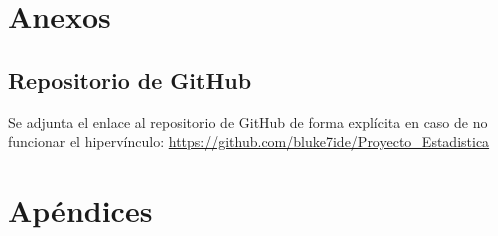 \documentclass[12pt,oneside,letterpaper,spanish]{report}
\begin{document}


\newpage
\doublespacing
\renewcommand{\baselinestretch}{1}\normalsize
\tableofcontents
\renewcommand{\baselinestretch}{1}\normalsize
\singlespacing
\thispagestyle{fancy} %

\newpage
{} 






%
%
\label{EndOfText}
\newpage
{}
\thispagestyle{fancy}



 \label{referencias}
\nocite{*}

 
\thispagestyle{fancy}

\chapter{Anexos}

\section{Repositorio de GitHub} \label{github}
Se adjunta el enlace al repositorio de GitHub de forma explícita en caso de no funcionar el hipervínculo: \url{https://github.com/bluke7ide/Proyecto_Estadistica}


\chapter{Apéndices} \label{Apendices}


\newpage


\newpage



\label{endOfDoc}
\end{document}
